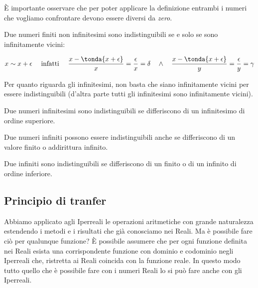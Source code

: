\begin{osservazione}
 È importante osservare che per poter applicare la definizione entrambi i 
numeri che vogliamo confrontare devono essere diversi da \emph{zero}.
\end{osservazione}

\begin{definizione}
Due numeri finiti non infinitesimi sono indistinguibili se e solo se 
sono infinitamente vicini:

\[x \sim x+\epsilon \quad \text{ infatti } \quad
\frac{x-\tonda{x+\epsilon}}{x} = \frac{\epsilon}{x}= \delta \quad \wedge \quad 
\frac{x-\tonda{x+\epsilon}}{y} = \frac{\epsilon}{y}= \gamma
\]

\end{definizione}


Per quanto riguarda gli infinitesimi, non basta che siano infinitamente vicini 
per essere indistinguibili (d'altra parte tutti gli infinitesimi sono 
infinitamente vicini).

\begin{definizione}
Due numeri infinitesimi sono indistinguibili se differiscono di un 
infinitesimo di ordine superiore.
\end{definizione}

Due numeri infiniti possono essere indistinguibili anche se differiscono di un 
valore finito o addirittura infinito. 

\begin{definizione}
Due infiniti sono indistinguibili se 
differiscono di un finito o di un infinito di ordine inferiore.
\end{definizione}

\subsection{Principio di tranfer}
\label{subsec:insnum_nonarchimedei}

Abbiamo applicato agli Iperreali le operazioni aritmetiche con grande 
naturalezza estendendo i metodi e i risultati che già conosciamo nei Reali. 
Ma è possibile fare ciò per qualunque funzione? 
È possibile assumere che per ogni funzione definita nei Reali esista una 
corrispondente funzione con dominio e codominio negli Iperreali che, ristretta 
ai Reali coincida con la funzione reale.
In questo modo tutto quello che è possibile fare con i numeri Reali lo si può 
fare anche con gli Iperreali.

